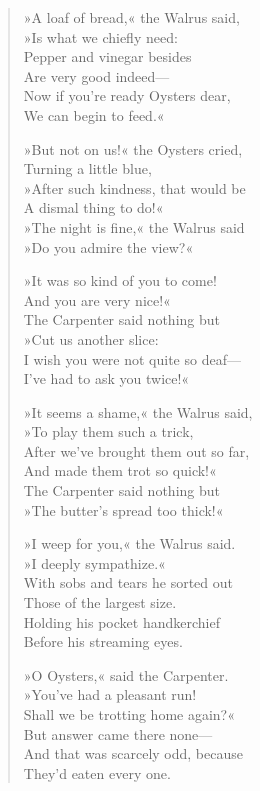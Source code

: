 \begin{verse}
»A loaf of bread,« the Walrus said,\\
\vin »Is what we chiefly need:\\
Pepper and vinegar besides\\
\vin Are very good indeed—\\
Now if you're ready Oysters dear,\\
\vin We can begin to feed.«

»But not on us!« the Oysters cried,\\
\vin Turning a little blue,\\
»After such kindness, that would be\\
\vin A dismal thing to do!«\\
»The night is fine,« the Walrus said\\
\vin »Do you admire the view?«

»It was so kind of you to come!\\
\vin And you are very nice!«\\
The Carpenter said nothing but\\
\vin »Cut us another slice:\\
I wish you were not quite so deaf—\\
\vin I've had to ask you twice!«

»It seems a shame,« the Walrus said,\\
\vin »To play them such a trick,\\
After we've brought them out so far,\\
\vin And made them trot so quick!«\\
The Carpenter said nothing but\\
\vin »The butter's spread too thick!«

»I weep for you,« the Walrus said.\\
\vin »I deeply sympathize.«\\
With sobs and tears he sorted out\\
\vin Those of the largest size.\\
Holding his pocket handkerchief\\
\vin Before his streaming eyes.

»O Oysters,« said the Carpenter.\\
\vin »You've had a pleasant run!\\
Shall we be trotting home again?«\\
\vin But answer came there none—\\
And that was scarcely odd, because\\
\vin They'd eaten every one.
\end{verse}

